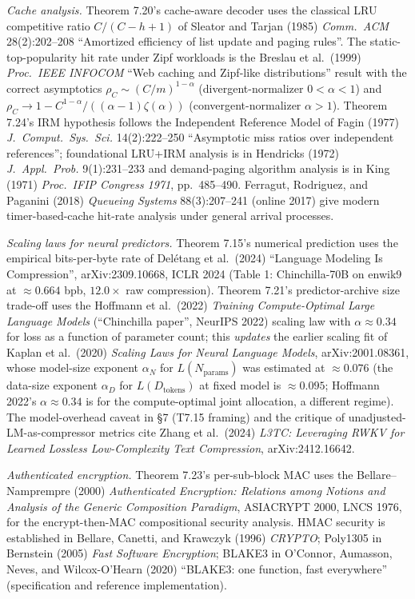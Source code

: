 \documentclass[
]{article}
\begin{document}
\emph{Cache analysis.} Theorem 7.20's cache-aware decoder uses the
classical LRU competitive ratio $C/(C-h+1)$ of Sleator and Tarjan
(1985) \emph{Comm.\ ACM} 28(2):202--208 ``Amortized efficiency of
list update and paging rules''. The static-top-popularity hit rate
under Zipf workloads is the Breslau et al.\ (1999) \emph{Proc.\ IEEE
INFOCOM} ``Web caching and Zipf-like distributions'' result with
the correct asymptotics $\rho_C \sim (C/m)^{1-\alpha}$
(divergent-normalizer $0<\alpha<1$) and
$\rho_C \to 1 - C^{1-\alpha}/((\alpha-1)\zeta(\alpha))$
(convergent-normalizer $\alpha>1$). Theorem 7.24's IRM hypothesis
follows the Independent Reference Model of Fagin (1977)
\emph{J.\ Comput.\ Sys.\ Sci.} 14(2):222--250 ``Asymptotic miss
ratios over independent references''; foundational LRU+IRM analysis
is in Hendricks (1972) \emph{J.\ Appl.\ Prob.} 9(1):231--233 and
demand-paging algorithm analysis is in King (1971)
\emph{Proc.\ IFIP Congress 1971}, pp.\ 485--490. Ferragut, Rodriguez, and
Paganini (2018) \emph{Queueing Systems} 88(3):207--241 (online 2017)
give modern timer-based-cache hit-rate analysis under general arrival
processes.

\emph{Scaling laws for neural predictors.} Theorem 7.15's numerical
prediction uses the empirical bits-per-byte rate of Delétang et al.\
(2024) ``Language Modeling Is Compression'', arXiv:2309.10668,
ICLR 2024 (Table 1: Chinchilla-70B on enwik9 at $\approx 0.664$ bpb,
$12.0\times$ raw compression). Theorem 7.21's predictor-archive size
trade-off uses the Hoffmann et al.\ (2022)
\emph{Training Compute-Optimal Large Language Models}
(``Chinchilla paper'', NeurIPS 2022) scaling law with $\alpha
\approx 0.34$ for loss as a function of parameter count; this
\emph{updates} the earlier scaling fit of Kaplan et al.\ (2020)
\emph{Scaling Laws for Neural Language Models}, arXiv:2001.08361,
whose model-size exponent $\alpha_N$ for $L(N_{\mathrm{params}})$
was estimated at $\approx 0.076$ (the data-size exponent $\alpha_D$
for $L(D_{\mathrm{tokens}})$ at fixed model is $\approx 0.095$;
Hoffmann 2022's $\alpha \approx 0.34$ is for the compute-optimal
joint allocation, a different regime). The
model-overhead caveat in §7 (T7.15 framing) and the critique of
unadjusted-LM-as-compressor metrics cite Zhang et al.\ (2024)
\emph{L3TC: Leveraging RWKV for Learned Lossless Low-Complexity
Text Compression}, arXiv:2412.16642.

\emph{Authenticated encryption.} Theorem 7.23's per-sub-block MAC
uses the Bellare--Namprempre (2000)
\emph{Authenticated Encryption: Relations among Notions and
Analysis of the Generic Composition Paradigm}, ASIACRYPT 2000,
LNCS 1976, for the encrypt-then-MAC compositional security
analysis. HMAC security is established in Bellare, Canetti, and
Krawczyk (1996) \emph{CRYPTO}; Poly1305 in Bernstein (2005)
\emph{Fast Software Encryption}; BLAKE3 in O'Connor, Aumasson,
Neves, and Wilcox-O'Hearn (2020) ``BLAKE3: one function, fast
everywhere'' (specification and reference implementation).
\end{document}
